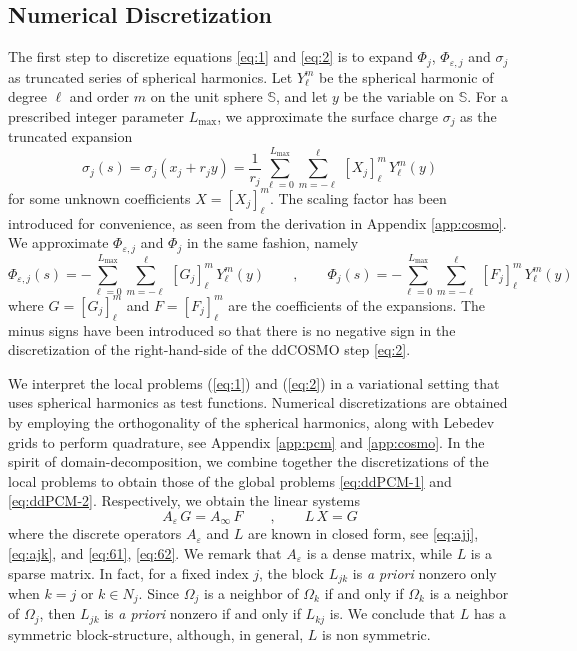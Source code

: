 \subsection{Numerical Discretization}

The first step to discretize equations \eqref{eq:1} and \eqref{eq:2} is to expand $\Phi_j$, $\Phi_{\varepsilon,j}$ and $\sigma_j$ as truncated series of spherical harmonics. Let $Y_\ell^m$ be the spherical harmonic of degree $\ell$ and order $m$ on the unit sphere $\mathbb{S}$, and let $y$ be the variable on $\mathbb{S}$. For a prescribed integer parameter ${L_\text{max}}$,  we approximate the surface charge $\sigma_j$ as the truncated expansion
\[
\sigma_j(s) = \sigma_j(x_j + r_j y) = \frac{1}{r_j} \, \sum_{\ell=0}^{L_\text{max}} \sum_{m = -\ell}^\ell \, [X_j]_\ell^m \, Y_\ell^m(y)
\]
for some unknown coefficients $X = [X_j]_\ell^m$. %
The scaling factor has been introduced for convenience, as seen from the derivation in Appendix \ref{app:cosmo}. We approximate $\Phi_{\varepsilon,j}$ and $\Phi_j$ in the same fashion, namely
\begin{equation}\label{eq:71}
\Phi_{\varepsilon,j}(s) = - \sum_{\ell=0}^{L_\text{max}} \sum_{m = -\ell}^\ell \, [G_j]_\ell^m \, Y_\ell^m(y) \qquad , \qquad \Phi_j(s) = -\sum_{\ell=0}^{L_\text{max}} \sum_{m = -\ell}^\ell \, [F_j]_\ell^m \, Y_\ell^m(y)
\end{equation}
where $G = [G_j]_\ell^m$ and $F = [F_j]_\ell^m$ are the coefficients of the expansions. The minus signs have been introduced so that there is no negative sign in the discretization of the right-hand-side of the ddCOSMO step \eqref{eq:2}. 


We interpret the local problems (\ref{eq:1}) and (\ref{eq:2}) in a variational setting that uses spherical harmonics as test functions. Numerical discretizations are obtained by employing the orthogonality of the spherical harmonics, along with Lebedev grids to perform quadrature, see Appendix \ref{app:pcm} and \ref{app:cosmo}. In the spirit of domain-decomposition, we combine together the discretizations of the local problems to obtain those of the global problems \eqref{eq:ddPCM-1} and \eqref{eq:ddPCM-2}. Respectively, we obtain the linear systems
\begin{equation}\label{eq:6}
A_\varepsilon \, G = A_\infty \, F \qquad , \qquad  L \, X = G
\end{equation}
where the discrete operators $A_\varepsilon$ and $L$ are known in closed form, see \eqref{eq:ajj}, \eqref{eq:ajk}, and \eqref{eq:61}, \eqref{eq:62}. We remark that $A_\varepsilon$ is a dense matrix, while $L$ is a sparse matrix. In fact, for a fixed index $j$, the block $L_{jk}$ is \emph{a priori} nonzero only when $k = j$ or $k \in N_j$. Since $\Omega_j$ is a neighbor of $\Omega_k$ if and only if $\Omega_k$ is a neighbor of $\Omega_j$, then $L_{jk}$ is \emph{a priori} nonzero if and only if $L_{kj}$ is. We conclude that $L$ has a symmetric block-structure, although, in general, $L$ is non symmetric.

